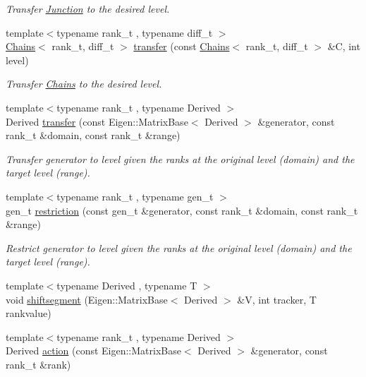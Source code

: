 \begin{DoxyCompactItemize}
\begin{DoxyCompactList}\small\item\em Transfer \hyperlink{classMackey_1_1Junction}{Junction} to the desired level. \end{DoxyCompactList}\item 
{\footnotesize template$<$typename rank\+\_\+t , typename diff\+\_\+t $>$ }\\\hyperlink{classMackey_1_1Chains}{Chains}$<$ rank\+\_\+t, diff\+\_\+t $>$ \hyperlink{namespaceMackey_a50837580391b5c6705e23c637d742b22}{transfer} (const \hyperlink{classMackey_1_1Chains}{Chains}$<$ rank\+\_\+t, diff\+\_\+t $>$ \&C, int level)
\begin{DoxyCompactList}\small\item\em Transfer \hyperlink{classMackey_1_1Chains}{Chains} to the desired level. \end{DoxyCompactList}\item 
{\footnotesize template$<$typename rank\+\_\+t , typename Derived $>$ }\\Derived \hyperlink{namespaceMackey_a0550bf97e47b3c319cb5e1bd81008d89}{transfer} (const Eigen\+::\+Matrix\+Base$<$ Derived $>$ \&generator, const rank\+\_\+t \&domain, const rank\+\_\+t \&range)
\begin{DoxyCompactList}\small\item\em Transfer generator to level given the ranks at the original level (domain) and the target level (range). \end{DoxyCompactList}\item 
{\footnotesize template$<$typename rank\+\_\+t , typename gen\+\_\+t $>$ }\\gen\+\_\+t \hyperlink{namespaceMackey_ad1e907ff76b07d4fc4c9d4bdf25918bd}{restriction} (const gen\+\_\+t \&generator, const rank\+\_\+t \&domain, const rank\+\_\+t \&range)
\begin{DoxyCompactList}\small\item\em Restrict generator to level given the ranks at the original level (domain) and the target level (range). \end{DoxyCompactList}\item 
{\footnotesize template$<$typename Derived , typename T $>$ }\\void \hyperlink{namespaceMackey_aab8a6292210a3b71960cb03b79d218e6}{shiftsegment} (Eigen\+::\+Matrix\+Base$<$ Derived $>$ \&V, int tracker, T rankvalue)
\item 
{\footnotesize template$<$typename rank\+\_\+t , typename Derived $>$ }\\Derived \hyperlink{namespaceMackey_aa515b26c0fbc7f19b36cee7d826f07b9}{action} (const Eigen\+::\+Matrix\+Base$<$ Derived $>$ \&generator, const rank\+\_\+t \&rank)

\end{DoxyCompactItemize}
